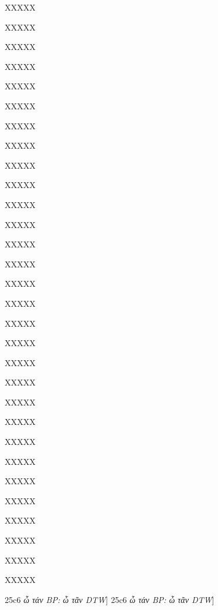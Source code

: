 \documentclass[11pt,a4paper]{book}
\begin{document}
\begin{greek}
\numberpstarttrue
\resumenumbering

\pstart{}XXXXX\pend

\pstart{}XXXXX\pend

\pstart{}XXXXX\pend

\pstart{}XXXXX\pend

\pstart{}XXXXX\pend

\pstart{}XXXXX\pend

\pstart{}XXXXX\pend

\pstart{}XXXXX\pend

\pstart{}XXXXX\pend

\pstart{}XXXXX\pend

\pstart{}XXXXX\pend

\pstart{}XXXXX\pend

\pstart{}XXXXX\pend

\pstart{}XXXXX\pend

\pstart{}XXXXX\pend

\pstart{}XXXXX\pend

\pstart{}XXXXX\pend

\pstart{}XXXXX\pend

\pstart{}XXXXX\pend

\pstart{}XXXXX\pend

\pstart{}XXXXX\pend

\pstart{}XXXXX\pend

\pstart{}XXXXX\pend

\pstart{}XXXXX\pend

\pstart{}XXXXX\pend

\pstart{}XXXXX\pend

\pstart{}XXXXX\pend

\pstart{}XXXXX\pend

\pstart{}XXXXX\pend

\pstart{}XXXXX\pend

\pstart
25c6 \textit{ὦ τάν BP: ὦ τᾶν DTW}] %
\pend
\pstart
25c6 \textit{ὦ τάν BP: ὦ τᾶν DTW}] %
\pend

\pausenumbering


\end{greek}
\end{document}
